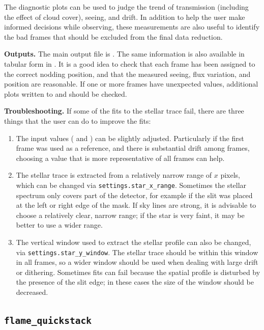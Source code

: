 \documentclass[a4paper]{article}
\begin{document}
The diagnostic plots can be used to judge the trend of transmission (including the effect of cloud cover), seeing, and drift. In addition to help the user make informed decisions while observing, these measurements are also useful to identify the bad frames that should be excluded from the final data reduction.

\medskip
\noindent
\textbf{Outputs.} The main output file is . The same information is also available in tabular form in . It is a good idea to check that each frame has been assigned to the correct nodding position, and that the measured seeing, flux variation, and position are reasonable. If one or more frames have unexpected values, additional plots written to  and  should be checked.

\medskip
\noindent
\textbf{Troubleshooting.} If some of the fits to the stellar trace fail, there are three things that the user can do to improve the fits:
\begin{enumerate}
\item The input values ( and ) can be slightly adjusted. Particularly if the first frame was used as a reference, and there is substantial drift among frames, choosing a value that is more representative of all frames can help.
\item The stellar trace is extracted from a relatively narrow range of $x$ pixels, which can be changed via \texttt{settings.star\_x\_range}. Sometimes the stellar spectrum only covers part of the detector, for example if the slit was placed at the left or right edge of the mask. If sky lines are strong, it is advisable to choose a relatively clear, narrow range; if the star is very faint, it may be better to use a wider range.
\item The vertical window used to extract the stellar profile can also be changed, via \texttt{settings.star\_y\_window}. The stellar trace should be within this window in all frames, so a wider window should be used when dealing with large drift or dithering. Sometimes fits can fail because the spatial profile is disturbed by the presence of the slit edge; in these cases the size of the window should be decreased.
\end{enumerate}


\subsection{\texttt{flame\_quickstack}}
\end{document}

